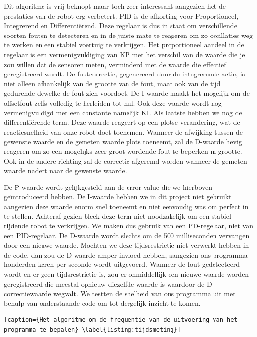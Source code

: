 Dit algoritme is vrij beknopt maar toch zeer interessant aangezien het de prestaties van de robot erg verbetert. PID is de afkorting voor Proportioneel, Integrerend en Differenti\"erend. Deze regelaar is dus in staat om verschillende soorten fouten te detecteren en in de juiste mate te reageren om zo oscillaties weg te werken en een stabiel voertuig te verkrijgen. Het proportioneel aandeel in de regelaar is een vermenigvuldiging van KP met het verschil van de waarde die je zou willen dat de sensoren meten, verminderd met de waarde die effectief geregistreerd wordt. De foutcorrectie, gegenereerd door de integrerende actie, is niet alleen afhankelijk van de grootte van de fout, maar ook van de tijd gedurende dewelke de fout zich voordoet. De I-waarde maakt het mogelijk om de offsetfout zelfs volledig te herleiden tot nul. Ook deze waarde wordt nog vermenigvuldigd met een constante namelijk KI. Als laatste hebben we nog de differenti\"erende term. Deze waarde reageert op een plotse verandering, wat de reactiesnelheid van onze robot doet toenemen. Wanneer de afwijking tussen de gewenste waarde en de gemeten waarde plots toeneemt, zal de D-waarde hevig reageren om zo een mogelijks zeer groot wordende fout te beperken in grootte. Ook in de andere richting zal de correctie afgeremd worden wanneer de gemeten waarde nadert naar de gewenste waarde. 

De P-waarde wordt gelijkgesteld aan de error value die we hierboven ge\"introduceerd hebben. De I-waarde hebben we in dit project niet gebruikt aangezien deze waarde enorm snel toeneemt en niet eenvoudig was om perfect in te stellen. Achteraf gezien bleek deze term niet noodzakelijk om een stabiel rijdende robot te verkrijgen. We maken dus gebruik van een PD-regelaar, niet van een PID-regelaar. De D-waarde wordt slechts om de 500 milliseconden vervangen door een nieuwe waarde. Mochten we deze tijdsrestrictie niet verwerkt hebben in de code, dan zou de D-waarde amper invloed hebben, aangezien ons programma honderden keren per seconde wordt uitgevoerd. Wanneer de fout gedetecteerd wordt en er geen tijdsrestrictie is, zou er onmiddellijk een nieuwe waarde worden geregistreerd die meestal opnieuw diezelfde waarde is waardoor de D-correctiewaarde wegvalt. We testten de snelheid van ons programma uit met behulp van onderstaande code om tot dergelijk inzicht te komen.

\begin{lstlisting}[caption={Het algoritme om de frequentie van de uitvoering van het programma te bepalen} \label{listing:tijdsmeting}]
\end{lstlisting}

